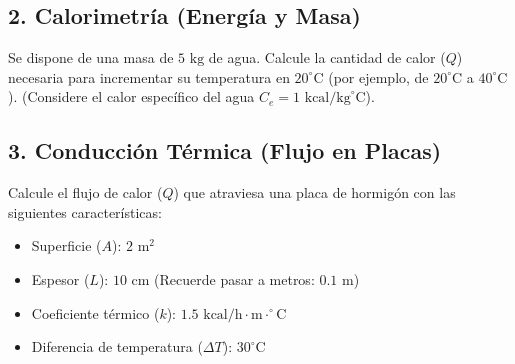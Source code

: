 \documentclass[12pt]{article}
\begin{document}
\subsection*{2. Calorimetría (Energía y Masa)}

Se dispone de una masa de $5\text{ kg}$ de agua. Calcule la cantidad de calor ($Q$) necesaria para incrementar su temperatura en $20^\circ\text{C}$ (por ejemplo, de $20^\circ\text{C}$ a $40^\circ\text{C}$). (Considere el calor específico del agua $C_e = 1\text{ kcal/kg}^\circ\text{C}$).

\vspace{6cm}

\hr

\subsection*{3. Conducción Térmica (Flujo en Placas)}

Calcule el flujo de calor ($Q$) que atraviesa una placa de hormigón con las siguientes características:

\begin{itemize}
    \item Superficie ($A$): $2\text{ m}^2$
    \item Espesor ($L$): $10\text{ cm}$ (Recuerde pasar a metros: $0.1\text{ m}$)
    \item Coeficiente térmico ($k$): $1.5\text{ kcal/h}\cdot\text{m}\cdot^\circ\text{C}$
    \item Diferencia de temperatura ($\Delta T$): $30^\circ\text{C}$
\end{itemize}

\vspace{6cm}
\end{document}
